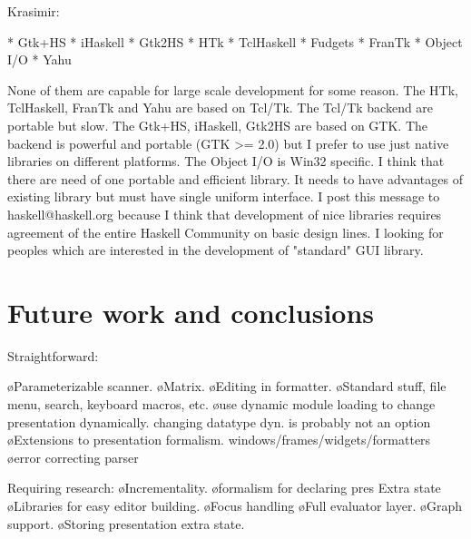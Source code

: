 \bc Krasimir:

  * Gtk+HS
   * iHaskell
   * Gtk2HS
   * HTk
   * TclHaskell
   * Fudgets
   * FranTk
   * Object I/O
   * Yahu

None of them are capable for large scale development 
for some reason. The HTk, TclHaskell, FranTk and Yahu 
are based on Tcl/Tk. The Tcl/Tk backend are portable 
but slow. The Gtk+HS, iHaskell, Gtk2HS are based on
GTK. The backend is powerful and portable (GTK >= 2.0)
but I prefer to use just native libraries on 
different platforms. The Object I/O is Win32 specific.
I think that there are need of one portable and 
efficient library. It needs to have advantages of
existing library but must have single uniform
interface. I post this message to haskell@haskell.org 
because I think that development of nice libraries 
requires agreement of the entire Haskell Community on
basic design lines. I looking for peoples which are
interested in the development of "standard" GUI
library. \ec

\section{Future work and conclusions}
Straightforward:

\bl
\o Parameterizable scanner.
\o Matrix.
\o Editing in formatter.
\o Standard stuff, file menu, search, keyboard macros, etc.
\o use dynamic module loading to change presentation dynamically. changing datatype dyn. is probably not an option
\o Extensions to presentation formalism. windows/frames/widgets/formatters
\o error correcting parser
\el

Requiring research:
\bl
\o Incrementality.
\o formalism for declaring pres Extra state
\o Libraries for easy editor building.
\o Focus handling
\o Full evaluator layer.
\o Graph support.
\o Storing presentation extra state.
\el